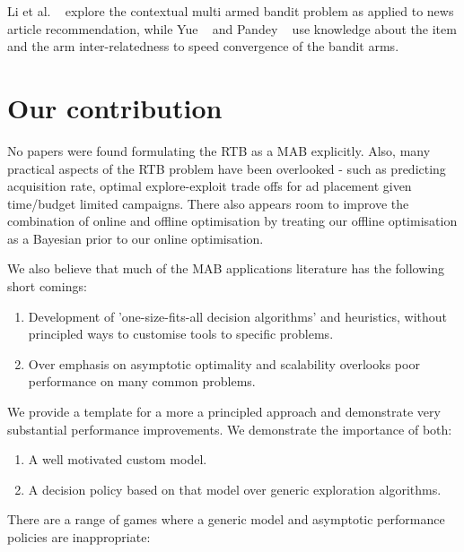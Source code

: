 \documentclass[11pt,a4,singlespacing,titlepagenumber=on]{scrreprt}
\numberwithin{equation}{chapter} %
\theoremstyle{remark}
\begin{document}
Li et al. ~\cite{Li:2010:CAP:1772690.1772758} explore the contextual multi armed bandit problem as applied to news article recommendation, while Yue ~\cite{yue2012hierarchical} and Pandey ~\cite{pandey2007bandits} use knowledge about the item and the arm inter-relatedness to speed convergence of the bandit arms.

\section{Our contribution}

No papers were found formulating the RTB as a MAB explicitly. Also, many practical aspects of the RTB problem have been overlooked - such as predicting acquisition rate, optimal explore-exploit trade offs for ad placement given time/budget limited campaigns. There also appears room to improve the combination of online and offline optimisation by treating our offline optimisation as a Bayesian prior to our online optimisation.

We also believe that much of the MAB applications literature has the following short comings:

\begin{enumerate}
	\item Development of 'one-size-fits-all decision algorithms' and heuristics, without principled ways to customise tools to specific problems.
	\item Over emphasis on asymptotic optimality and scalability overlooks poor performance on many common problems.
\end{enumerate}

We provide a template for a more a principled approach and demonstrate very substantial performance improvements. We demonstrate the importance of both:

\begin{enumerate}
	\item A well motivated custom model.
	\item A decision policy based on that model over generic exploration algorithms.
\end{enumerate}

There are a range of games where a generic model and asymptotic performance policies are inappropriate:
\end{document}
